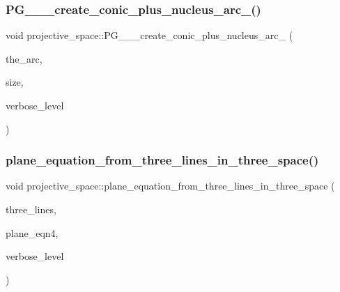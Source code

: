 \mbox{\label{classprojective__space_ac62af97d3b119c3ba8a619d08b2f1e0f}} 
\subsubsection{\texorpdfstring{P\+G\+\_\+\_\+\_\+create\+\_\+conic\+\_\+plus\+\_\+nucleus\+\_\+arc\+\_()}{PG\_2\_8\_create\_conic\_plus\_nucleus\_arc\_2()}}
{\footnotesize\ttfamily void projective\+\_\+space\+::\+P\+G\+\_\+\_\+\_\+create\+\_\+conic\+\_\+plus\+\_\+nucleus\+\_\+arc\+\_ (\begin{DoxyParamCaption}\item[{\mbox{\hyperlink{galois_8h_a09fddde158a3a20bd2dcadb609de11dc}{I\+NT}} $\ast$}]{the\+\_\+arc,  }\item[{\mbox{\hyperlink{galois_8h_a09fddde158a3a20bd2dcadb609de11dc}{I\+NT}} \&}]{size,  }\item[{\mbox{\hyperlink{galois_8h_a09fddde158a3a20bd2dcadb609de11dc}{I\+NT}}}]{verbose\+\_\+level }\end{DoxyParamCaption})}

\mbox{\label{classprojective__space_a173dd43f3b5720f46ab372c370f4687c}} 
\subsubsection{\texorpdfstring{plane\+\_\+equation\+\_\+from\+\_\+three\+\_\+lines\+\_\+in\+\_\+three\+\_\+space()}{plane\_equation\_from\_three\_lines\_in\_three\_space()}}
{\footnotesize\ttfamily void projective\+\_\+space\+::plane\+\_\+equation\+\_\+from\+\_\+three\+\_\+lines\+\_\+in\+\_\+three\+\_\+space (\begin{DoxyParamCaption}\item[{\mbox{\hyperlink{galois_8h_a09fddde158a3a20bd2dcadb609de11dc}{I\+NT}} $\ast$}]{three\+\_\+lines,  }\item[{\mbox{\hyperlink{galois_8h_a09fddde158a3a20bd2dcadb609de11dc}{I\+NT}} $\ast$}]{plane\+\_\+eqn4,  }\item[{\mbox{\hyperlink{galois_8h_a09fddde158a3a20bd2dcadb609de11dc}{I\+NT}}}]{verbose\+\_\+level }\end{DoxyParamCaption})}

